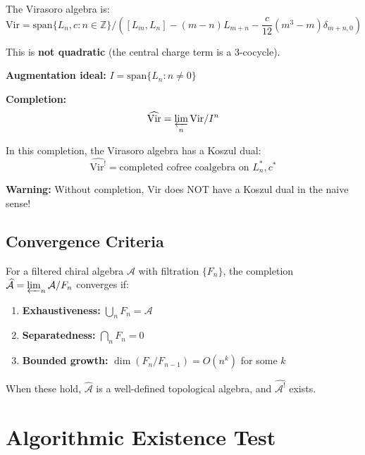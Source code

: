 \begin{example}\label{ex:virasoro-i-adic}
The Virasoro algebra is:
$$\text{Vir} = \text{span}\{L_n, c : n \in \mathbb{Z}\} / 
([L_m, L_n] - (m-n)L_{m+n} - \frac{c}{12}(m^3 - m)\delta_{m+n,0})$$

This is \textbf{not quadratic} (the central charge term is a 3-cocycle).

\textbf{Augmentation ideal:} $I = \text{span}\{L_n : n \neq 0\}$

\textbf{Completion:}
$$\widehat{\text{Vir}} = \varprojlim_n \text{Vir} / I^n$$

In this completion, the Virasoro algebra has a Koszul dual:
$$\widehat{\text{Vir}^!} = \text{completed cofree coalgebra on } L_n^*, c^*$$

\textbf{Warning:} Without completion, $\text{Vir}$ does NOT have a Koszul dual in 
the naive sense!
\end{example}

\subsection{Convergence Criteria}

\begin{theorem}\label{thm:completion-convergence}
For a filtered chiral algebra $\mathcal{A}$ with filtration $\{F_n\}$, the 
completion $\widehat{\mathcal{A}} = \varprojlim_n \mathcal{A}/F_n$ converges if:
\begin{enumerate}
\item \textbf{Exhaustiveness:} $\bigcup_n F_n = \mathcal{A}$
\item \textbf{Separatedness:} $\bigcap_n F_n = 0$
\item \textbf{Bounded growth:} $\dim(F_n / F_{n-1}) = O(n^k)$ for some $k$
\end{enumerate}

When these hold, $\widehat{\mathcal{A}}$ is a well-defined topological algebra, 
and $\widehat{\mathcal{A}^!}$ exists.
\end{theorem}


\section{Algorithmic Existence Test}
\label{sec:algorithmic-test}

